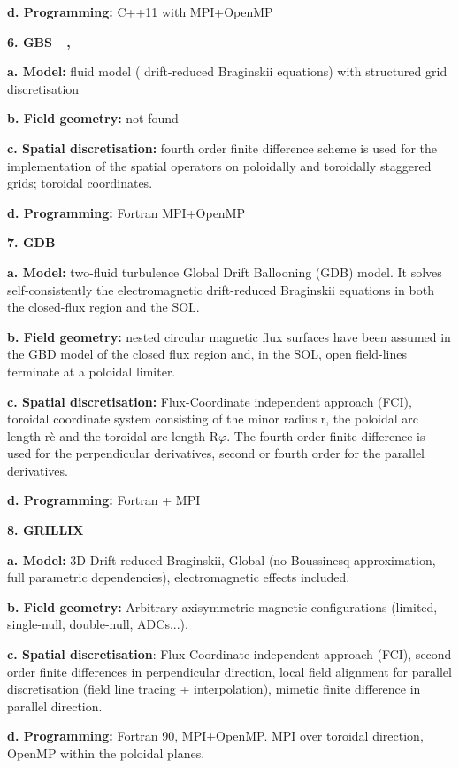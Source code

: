 \documentclass{article}
\begin{document}
\textbf{d. Programming: }C++11 with MPI+OpenMP

{ \textbf{6. GBS }}{~\cite{ref [14]}}{ \textbf{, 
}}{~\cite{ref [15]}}

\textbf{a. Model:} fluid model ({ drift-reduced}{\Large{}{  
}}Braginskii equations) with structured grid discretisation

\textbf{b. Field geometry:} not found

\textbf{c. Spatial discretisation: }fourth order finite difference scheme is used 
for the implementation of the spatial operators on poloidally and toroidally staggered 
grids; toroidal coordinates.

\textbf{d. Programming: }Fortran  MPI+OpenMP

{ \textbf{7. GDB }}{~\cite{ref [16]}}

\textbf{a. Model: }two-fluid turbulence Global Drift Ballooning (GDB) model. It 
solves self-consistently the electromagnetic drift-reduced Braginskii equations 
in both the closed-flux region and the SOL.

\textbf{b. Field geometry: }nested circular magnetic flux surfaces have been assumed 
in the GBD model of the closed flux region and, in the SOL, open field-lines terminate 
at a poloidal limiter.

\textbf{c. Spatial discretisation:} Flux-Coordinate independent approach (FCI), 
toroidal coordinate system consisting of the minor radius r, the poloidal arc length 
r\`e and the toroidal arc length R$\varphi$. The fourth order finite difference 
is used for the perpendicular derivatives, second or fourth order for the parallel 
derivatives.

\textbf{d. Programming: }Fortran + MPI

{ \textbf{8. GRILLIX }}{~\cite{ref [17]}}

\textbf{a. Model:} 3D Drift reduced Braginskii, Global (no Boussinesq approximation, 
full parametric dependencies), electromagnetic effects included.

\textbf{b. Field geometry:} Arbitrary axisymmetric magnetic configurations (limited, 
single-null, double-null, ADCs...).

\textbf{c. Spatial discretisation}: Flux-Coordinate independent approach (FCI), 
second order finite differences in perpendicular direction, local field alignment 
for parallel discretisation (field line tracing + interpolation), mimetic finite 
difference in parallel direction.

\textbf{d. Programming:} Fortran 90, MPI+OpenMP. MPI over toroidal direction, OpenMP 
within the poloidal planes.
\end{document}
